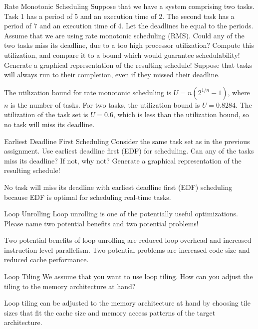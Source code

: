\documentclass{article}
\begin{document}
\begin{exercise}{Rate Monotonic Scheduling}
  Suppose that we have a system comprising two tasks. Task 1 has a period of 5 and an execution time of 2. The second task has a period of 7 and an execution time of 4. Let the deadlines be equal to the periods. Assume that we are using rate monotonic scheduling (RMS). Could any of the two tasks miss its deadline, due to a too high processor utilization? Compute this utilization, and compare it to a bound which would guarantee schedulability! Generate a graphical representation of the resulting schedule! Suppose that tasks will always run to their completion, even if they missed their deadline.

  \begin{solution}
    The utilization bound for rate monotonic scheduling is $U = n(2^{1/n} - 1)$, where $n$ is the number of tasks. For two tasks, the utilization bound is $U = 0.8284$. The utilization of the task set is $U = 0.6$, which is less than the utilization bound, so no task will miss its deadline.
  \end{solution}
\end{exercise}

\begin{exercise}{Earliest Deadline First Scheduling}
  Consider the same task set as in the previous assignment. Use earliest deadline first (EDF) for scheduling. Can any of the tasks miss its deadline? If not, why not? Generate a graphical representation of the resulting schedule!

  \begin{solution}
    No task will miss its deadline with earliest deadline first (EDF) scheduling because EDF is optimal for scheduling real-time tasks.
  \end{solution}
\end{exercise}

\begin{exercise}{Loop Unrolling}
  Loop unrolling is one of the potentially useful optimizations. Please name two potential benefits and two potential problems!

  \begin{solution}
    Two potential benefits of loop unrolling are reduced loop overhead and increased instruction-level parallelism. Two potential problems are increased code size and reduced cache performance.
  \end{solution}
\end{exercise}

\begin{exercise}{Loop Tiling}
  We assume that you want to use loop tiling. How can you adjust the tiling to the memory architecture at hand?

  \begin{solution}
    Loop tiling can be adjusted to the memory architecture at hand by choosing tile sizes that fit the cache size and memory access patterns of the target architecture.
  \end{solution}
\end{exercise}
\end{document}
